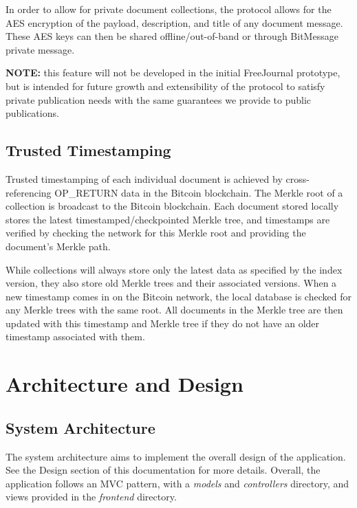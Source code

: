 \documentclass[letterpaper,10pt,oneside]{sphinxmanual}
\begin{document}
In order to allow for private document collections, the protocol allows for the AES encryption of the payload, description, and
title of any document message.  These AES keys can then be shared offline/out-of-band or through BitMessage private message.

\textbf{NOTE:} this feature will not be developed in the initial FreeJournal prototype, but is intended for future growth and
extensibility of the protocol to satisfy private publication needs with the same guarantees we provide to public publications.


\section{Trusted Timestamping}
\label{protocol:trusted-timestamping}
Trusted timestamping of each individual document is achieved by cross-referencing OP\_RETURN data in the Bitcoin blockchain.  The
Merkle root of a collection is broadcast to the Bitcoin blockchain.  Each document stored locally stores the latest
timestamped/checkpointed Merkle tree, and timestamps are verified by checking the network for this Merkle root and providing the
document's Merkle path.

While collections will always store only the latest data as specified by the index version, they also store old Merkle trees and
their associated versions.  When a new timestamp comes in on the Bitcoin network, the local database is checked for any Merkle
trees with the same root.  All documents in the Merkle tree are then updated with this timestamp and Merkle tree if they do not
have an older timestamp associated with them.


\chapter{Architecture and Design}
\label{architecture:architecture-and-design}\label{architecture::doc}

\section{System Architecture}
\label{architecture:system-architecture}
The system architecture aims to implement the overall design of the application.
See the Design section of this documentation for more details.  Overall, the application
follows an MVC pattern, with a \emph{models} and \emph{controllers} directory, and views provided in
the \emph{frontend} directory.
\end{document}
